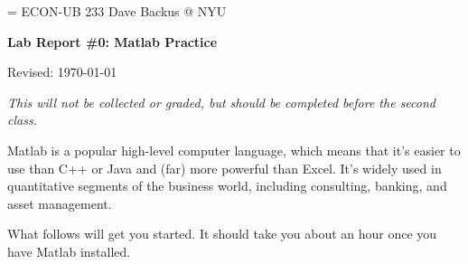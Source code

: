 \documentclass[11pt]{exam}
\begin{document}
\parskip=\bigskipamount
\parindent=0.0in
\thispagestyle{empty}
{\large ECON-UB 233 \hfill Dave Backus @ NYU}

\bigskip\bigskip
\centerline{\Large \bf Lab Report \#0:  Matlab Practice}
\centerline{Revised: \today}

\bigskip
{\it This will not be collected or graded,
but should be completed before the second class.
}

Matlab is a popular high-level computer language,
which means that it's easier to use than C++ or Java
and (far) more powerful than Excel.
It's widely used in quantitative segments of the business world,
including consulting, banking, and asset management.

What follows will get you started.  It should take you about an hour
once you have Matlab installed.
\end{document}
